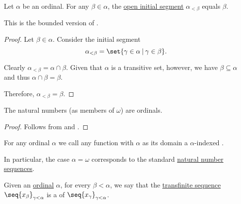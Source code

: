 \begin{proposition}\label{thm:initial_segment_of_ordinal}
  Let \( \alpha \) be an ordinal. For any \( \beta \in \alpha \), the \hyperref[def:order_interval/unbounded]{open initial segment} \( \alpha_{<\beta} \) equals \( \beta \).

  This is the bounded version of .
\end{proposition}
\begin{proof}
  Let \( \beta \in \alpha \). Consider the initial segment
  \begin{equation*}
    \alpha_{<\beta} = \set{ \gamma \in \alpha \given \gamma \in \beta }.
  \end{equation*}

  Clearly \( \alpha_{<\beta} = \alpha \cap \beta \). Given that \( \alpha \) is a transitive set, however, we have \( \beta \subseteq \alpha \) and thus \( \alpha \cap \beta = \beta \).

  Therefore, \( \alpha_{<\beta} = \beta \).
\end{proof}

\begin{corollary}\label{thm:natural_numbers_are_ordinals}
  The natural numbers (as members of \hyperref[thm:smallest_inductive_set_existence]{\( \omega \)}) are ordinals.
\end{corollary}
\begin{proof}
  Follows from  and .
\end{proof}

\begin{concept}\label{con:transfinite}
\end{concept}

\begin{definition}\label{def:transfinite_sequence}
  For any ordinal \( \alpha \) we call any function with \( \alpha \) as its domain a \( \alpha \)-indexed .

  In particular, the case \( \alpha = \omega \) corresponds to the standard \hyperref[def:sequence]{natural number sequences}.
\end{definition}

\begin{definition}\label{def:truncated_sequence}\mimprovised
  Given an \hyperref[def:ordinal]{ordinal} \( \alpha \), for every \( \beta < \alpha \), we say that the \hyperref[def:transfinite_sequence]{transfinite sequence} \( \seq{ x_\beta }_{\gamma < \alpha} \) is a  of \( \seq{ x_\gamma }_{\gamma < \alpha} \).
\end{definition}

